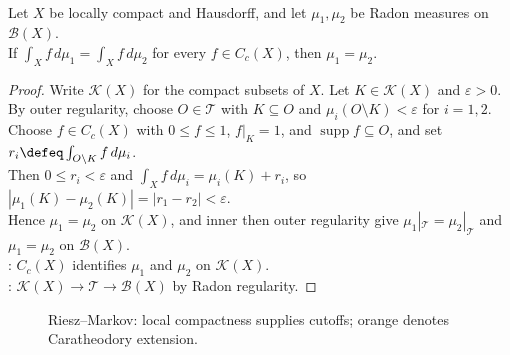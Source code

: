 \begin{theorem} \label{thm:radon-measures-determined-by-cc-integrals} \\
Let $X$ be locally compact and Hausdorff, and let $\mu_1,\mu_2$ be Radon measures on $\mathcal{B}(X)$.\\
If $\int_X f\,d\mu_1=\int_X f\,d\mu_2$ for every $f\in C_c(X)$, then $\mu_1=\mu_2$.
\begin{proof} Write $\mathcal{K}(X)$ for the compact subsets of $X$. Let $K\in\mathcal{K}(X)$ and $\varepsilon>0$.\\
By outer regularity, choose $O\in\mathcal{T}$ with $K\subseteq O$ and $\mu_i(O\setminus K)<\varepsilon$ for $i=1,2$.\\
Choose $f\in C_c(X)$ with $0\leq f\leq1$, $f|_K=1$, and $\operatorname{supp}f\subseteq O$, and set $r_i\defeq\int_{O\setminus K}f\,d\mu_i$.\\
Then $0\leq r_i<\varepsilon$ and $\int_X f\,d\mu_i=\mu_i(K)+r_i$, so $|\mu_1(K)-\mu_2(K)|=|r_1-r_2|<\varepsilon$.\\
Hence $\mu_1=\mu_2$ on $\mathcal{K}(X)$, and inner then outer regularity give $\mu_1|_{\mathcal{T}}=\mu_2|_{\mathcal{T}}$ and $\mu_1=\mu_2$ on $\mathcal{B}(X)$.\\
: $C_c(X)$ identifies $\mu_1$ and $\mu_2$ on $\mathcal{K}(X)$.\\
: $\mathcal{K}(X)\to\mathcal{T}\to\mathcal{B}(X)$ by Radon regularity.
\end{proof}
\end{theorem}

\begin{figure}[H]
  \centering
  
  \caption{Riesz--Markov: local compactness supplies cutoffs; \textcolor{orange!75!black}{orange} denotes Caratheodory extension.}
  \label{fig:riesz-markov-open-set-measure-flow}
\end{figure}

